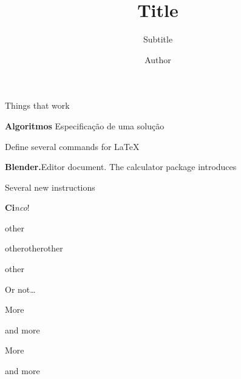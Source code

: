 \documentclass[10pt]{beamer}
\title{Title}
\subtitle{Subtitle}
\author{Author}
\begin{document}
\begin{frame}
    Things that work

    \hrulefill
    \bigskip
    \small
    \begin{mybox}[columns = 3, equal height = rows, palette = Two]
        \item %
        \textbf{Algoritmos}\newline
        Especificação de uma solução
        \item %
        Define several commands for \LaTeX
        \item \textbf{Blender.}\newline Editor document. The calculator package introduces
        \item Several new instructions
        \item \textbf{Ci}\textit{nco}!
        \item other
        \item other\newline other\newline other
        \item other
    \end{mybox}
    \hrulefill

    \bigskip
    Or not\ldots
\end{frame}

\begin{frame}
    \begin{mybox}[continued, columns = 3, palette = Two]
        \item More
        \item <2> and more
        \item More
        \item and more
    \end{mybox}
\end{frame}
\end{document}
